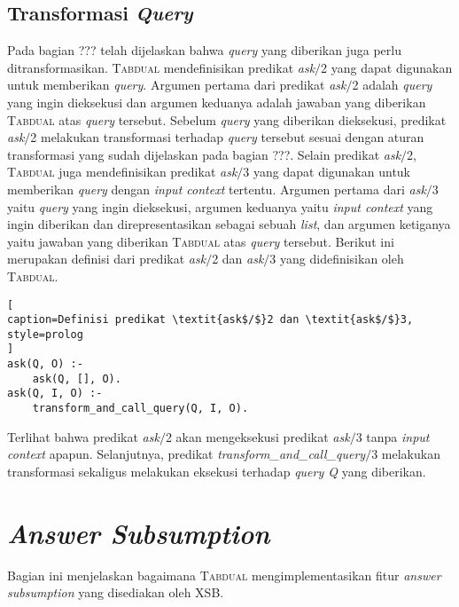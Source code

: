 \subsection{Transformasi \textit{Query}}

Pada bagian ??? telah dijelaskan bahwa \textit{query} yang diberikan juga perlu ditransformasikan. \textsc{Tabdual} mendefinisikan predikat \textit{ask$/$}2 yang dapat digunakan untuk memberikan \textit{query}. Argumen pertama dari predikat \textit{ask$/$}2 adalah \textit{query} yang ingin dieksekusi dan argumen keduanya adalah jawaban yang diberikan \textsc{Tabdual} atas \textit{query} tersebut. Sebelum \textit{query} yang diberikan dieksekusi, predikat \textit{ask$/$}2 melakukan transformasi terhadap \textit{query} tersebut sesuai dengan aturan transformasi yang sudah dijelaskan pada bagian ???. Selain predikat \textit{ask$/$}2, \textsc{Tabdual} juga mendefinisikan predikat \textit{ask$/$}3 yang dapat digunakan untuk memberikan \textit{query} dengan \textit{input context} tertentu. Argumen pertama dari \textit{ask$/$}3 yaitu \textit{query} yang ingin dieksekusi, argumen keduanya yaitu \textit{input context} yang ingin diberikan dan direpresentasikan sebagai sebuah \textit{list}, dan argumen ketiganya yaitu jawaban yang diberikan \textsc{Tabdual} atas \textit{query} tersebut. Berikut ini merupakan definisi dari predikat \textit{ask$/$}2 dan \textit{ask$/$}3 yang didefinisikan oleh \textsc{Tabdual}.
\\

\begin{lstlisting}[
caption=Definisi predikat \textit{ask$/$}2 dan \textit{ask$/$}3,
style=prolog
]
ask(Q, O) :- 
	ask(Q, [], O).
ask(Q, I, O) :-
	transform_and_call_query(Q, I, O).
\end{lstlisting}

Terlihat bahwa predikat \textit{ask$/$}2 akan mengeksekusi predikat \textit{ask$/$}3 tanpa \textit{input context} apapun. Selanjutnya, predikat \textit{transform\_and\_call\_query$/$}3 melakukan transformasi sekaligus melakukan eksekusi terhadap \textit{query Q} yang diberikan.

\section{\textit{Answer Subsumption}}

Bagian ini menjelaskan bagaimana \textsc{Tabdual} mengimplementasikan fitur \textit{answer subsumption} yang disediakan oleh XSB.

